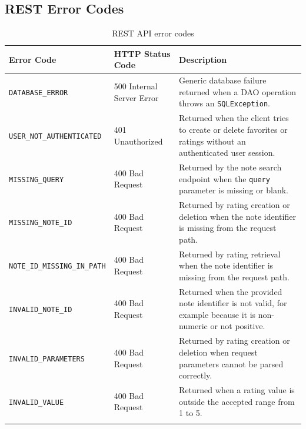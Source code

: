 \subsection{REST Error Codes}


\begin{longtable}{|p{}|p{} |p{}|}
\hline
\textbf{Error Code} & \textbf{HTTP Status Code} & \textbf{Description} \\\hline
\texttt{DATABASE\_ERROR} & 500 Internal Server Error & Generic database failure returned when a DAO operation throws an \texttt{SQLException}. \\\hline
\texttt{USER\_NOT\_AUTHENTICATED} & 401 Unauthorized & Returned when the client tries to create or delete favorites or ratings without an authenticated user session. \\\hline
\texttt{MISSING\_QUERY} & 400 Bad Request & Returned by the note search endpoint when the \texttt{query} parameter is missing or blank. \\\hline
\texttt{MISSING\_NOTE\_ID} & 400 Bad Request & Returned by rating creation or deletion when the note identifier is missing from the request path. \\\hline
\texttt{NOTE\_ID\_MISSING\_IN\_PATH} & 400 Bad Request & Returned by rating retrieval when the note identifier is missing from the request path. \\\hline
\texttt{INVALID\_NOTE\_ID} & 400 Bad Request & Returned when the provided note identifier is not valid, for example because it is non-numeric or not positive. \\\hline
\texttt{INVALID\_PARAMETERS} & 400 Bad Request & Returned by rating creation or deletion when request parameters cannot be parsed correctly. \\\hline
\texttt{INVALID\_VALUE} & 400 Bad Request & Returned when a rating value is outside the accepted range from 1 to 5. \\\hline
\caption{REST API error codes}
\label{tab:rest-api-error-codes}
\end{longtable}
